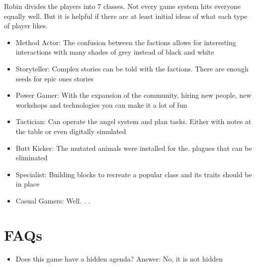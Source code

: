 Robin divides the players into 7 classes. Not every game system hits everyone equally well. But it is helpful if there are at least
initial ideas of what each type of player likes.
\begin{itemize}
\item Method Actor: The confusion between the factions allows for interesting interactions with many shades of grey instead of
black and white
\item Storyteller: Complex stories can be told with the factions. There are enough seeds for epic ones
stories
\item Power Gamer: With the expansion of the community, hiring new people, new workshops and technologies you can make it
a lot of fun
\item Tactician: Can operate the angel system and plan tasks. Either with notes at the table or even
digitally simulated
\item Butt Kicker: The mutated animals were installed for the. plagues that can be eliminated
\item Specialist: Building blocks to recreate a popular class and its traits should be in place
\item Casual Gamers: Well. . .
\end{itemize}

\section{FAQs}
\begin{itemize}
    \item Does this game have a hidden agenda? Answer: No, it is not hidden
\end{itemize}